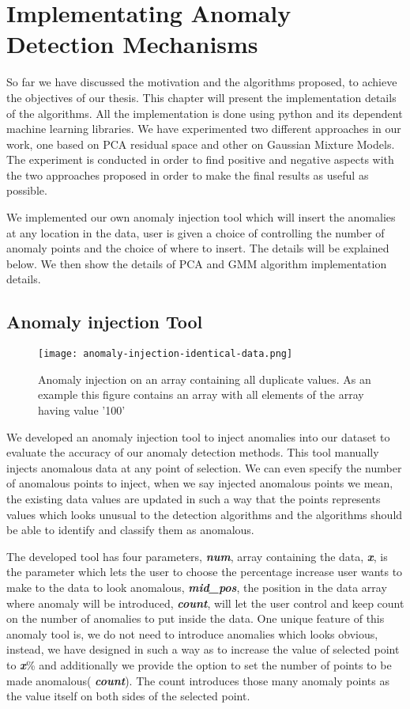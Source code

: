 \chapter{Implementating Anomaly Detection Mechanisms}
So far we have discussed the motivation and the algorithms proposed, to achieve the objectives of our thesis. This chapter will present the implementation details of the algorithms. All the implementation is done using python and its dependent machine learning libraries. We have experimented two different approaches in our work, one based on PCA residual space and other on Gaussian Mixture Models. The experiment is conducted in order to find positive and negative aspects with the two approaches proposed in order to make the final results as useful as possible.

We implemented our own anomaly injection tool which will insert the anomalies at any location in the data, user is given a choice of controlling the number of anomaly points and the choice of where to insert. The details will be explained below. We then show the details of PCA and GMM algorithm implementation details.
\\
\section{\textbf{Anomaly injection Tool}} 
\begin{figure}
\centerline{\texttt{[image: anomaly-injection-identical-data.png]}}
    \caption{Anomaly injection on an array containing all duplicate values. As an example this figure contains an array with all elements of the array having value '100'}
    \label{fig:ai_iden}
\end{figure}

We developed an anomaly injection tool to inject anomalies into our dataset to evaluate the accuracy of our anomaly detection methods. This tool manually injects anomalous data at any point of selection. We can even specify the number of anomalous points to inject, when we say injected anomalous points we mean, the existing data values are updated in such a way that the points represents values which looks unusual to the detection algorithms and the algorithms should be able to identify and classify them as anomalous. 

The developed tool has four parameters, \textbf{\textit{num}}, array containing the data, \textbf{\textit{x}}, is the parameter which lets the user to choose the percentage increase user wants to make to the data to look anomalous, \textbf{\textit{mid\_pos}}, the position in the data array where anomaly will be introduced, \textbf{\textit{count}}, will let the user control and keep count on the number of anomalies to put inside the data. One unique feature of this anomaly tool is, we do not need to introduce anomalies which looks obvious, instead, we have designed in such a way as to increase the value of selected point to  \textbf{\textit{x}}\% and additionally we provide the option to set the number of points to be made anomalous( \textbf{\textit{count}}). The count introduces those many anomaly points as the value itself on both sides of the selected point. 

